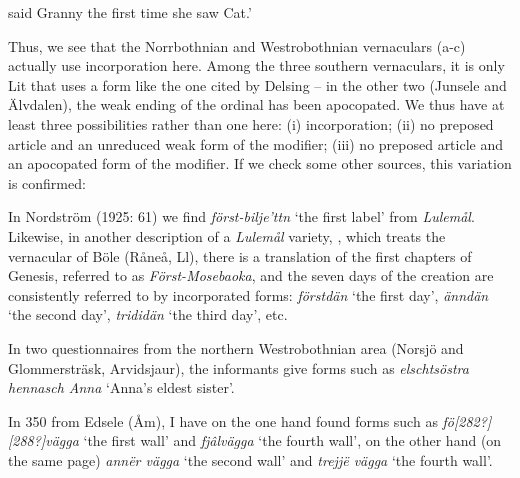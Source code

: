 \begin{styleTranslation}
 said Granny the first time she saw Cat.’

\end{styleTranslation}

\begin{styleBodyTextFirst}
Thus, we see that the Norrbothnian and Westrobothnian vernaculars (a-c) actually use incorporation here. Among the three southern vernaculars, it is only Lit that uses a form like the one cited by Delsing – in the other two (Junsele and Älvdalen), the weak ending of the ordinal has been apocopated. We thus have at least three possibilities rather than one here: (i) incorporation; (ii) no preposed article and an unreduced weak form of the modifier; (iii) no preposed article and an apocopated form of the modifier. If we check some other sources, this variation is confirmed:

\end{styleBodyTextFirst}

\begin{styleBodytextC}
In Nordström (1925: 61) we find \textit{först-bilje’ttn} ‘the first label’ from \textit{Lulemål}. Likewise, in another description of a \textit{Lulemål} variety, \citet{Wikberg2004}, which treats the vernacular of Böle (Råneå, Ll), there is a translation of the first chapters of Genesis, referred to as \textit{Först-Mosebaoka}, and the seven days of the creation are consistently referred to by incorporated forms: \textit{förstdän} ‘the first day’, \textit{änndän} ‘the second day’, \textit{trididän} ‘the third day’, etc. 

\end{styleBodytextC}

\begin{styleBodytextC}
In two questionnaires from the northern Westrobothnian area (Norsjö and Glommersträsk, Arvidsjaur), the informants give forms such as \textit{elschtsöstra hennasch Anna} ‘Anna’s eldest sister’.

\end{styleBodytextC}

\begin{styleBodytextC}
In 350 from Edsele (Åm), I have on the one hand found forms such as \textit{fö[282?][288?]vägga} ‘the first wall’ and \textit{fjâlvägga }‘the fourth wall’, on the other hand (on the same page) \textit{annër vägga} ‘the second wall’ and \textit{trejjë vägga }‘the fourth wall’.

\end{styleBodytextC}

